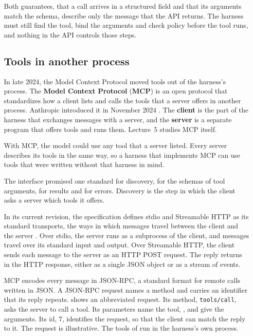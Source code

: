 Both guarantees, that a call arrives in a structured field and that its arguments match the schema,
describe only the message that the API returns. The harness must still find the tool, bind the
arguments and check policy before the tool runs, and nothing in the API controls those steps.

\subsection{Tools in another process}
\label{sec:toolcalls-mcp}

In late 2024, the Model Context Protocol moved tools out of the harness's process. The
\textbf{Model Context Protocol} (\textbf{MCP}) is an open protocol that standardizes how a client
lists and calls the tools that a server offers in another process. Anthropic introduced it in
November 2024 \citep{anthropic2024mcp}. The \textbf{client} is the part of the harness that
exchanges messages with a server, and the \textbf{server} is a separate program that offers tools
and runs them. Lecture~5 studies MCP itself.

With MCP, the model could use any tool that a server listed. Every server describes its tools in the
same way, so a harness that implements MCP can use tools that were written without that harness in
mind.

The interface promised one standard for discovery, for the schemas of tool arguments, for results
and for errors. Discovery is the step in which the client asks a server which tools it offers.

In its current revision, the specification defines stdio and Streamable HTTP as its standard
transports, the ways in which
messages travel between the client and the server \citep{mcp-spec-2026-07-28}. Over stdio, the
server runs as a subprocess of the client, and messages travel over its standard input and output.
Over Streamable HTTP, the client sends each message to the server as an HTTP POST request. The reply
returns in the HTTP response, either as a single JSON object or as a stream of events.

MCP encodes every message in JSON-RPC, a standard format for remote calls written in JSON. A
JSON-RPC request names a method and carries an identifier that its reply repeats.
 shows an abbreviated request. Its method, \texttt{tools/call}, asks the
server to call a tool. Its parameters name the tool, , and give the arguments. Its
id, 7, identifies the request, so that the client can match the reply to it. The request is
illustrative. The tools of \msa{} run in the harness's own process.

